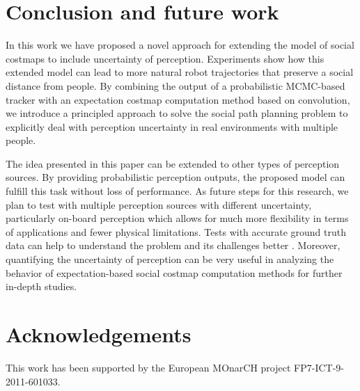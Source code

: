 \section{Conclusion and future work}
\label{sec:conclusion}

In this work we have proposed a novel approach for extending the model of social costmaps to include uncertainty of perception. Experiments show how this extended model can lead to more natural robot trajectories that preserve a social distance from people. By combining the output of a probabilistic MCMC-based tracker with an expectation costmap computation method based on convolution, we introduce a principled approach to solve the social path planning problem to explicitly deal with perception uncertainty in real environments with multiple people. 

The idea presented in this paper can be extended to other types of perception sources. By providing probabilistic perception outputs, the proposed model can fulfill this task without loss of performance. As future steps for this research, we plan to test with multiple perception sources with different uncertainty, particularly on-board perception which allows for much more flexibility in terms of applications and fewer physical limitations.
Tests with accurate ground truth data can help to understand the problem and its challenges better . Moreover, quantifying the uncertainty of perception  can be very useful in analyzing the behavior of expectation-based social costmap computation methods for further in-depth studies.  


\section*{Acknowledgements}

This work has been supported by the European MOnarCH project FP7-ICT-9-2011-601033. 
